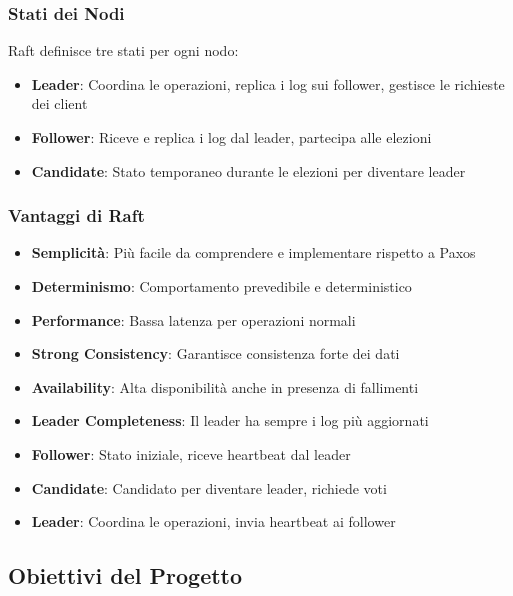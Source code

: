 \documentclass[12pt,a4paper]{article}
\begin{document}
\subsubsection{Stati dei Nodi}

Raft definisce tre stati per ogni nodo:
\begin{itemize}
\item \textbf{Leader}: Coordina le operazioni, replica i log sui follower, gestisce le richieste dei client
\item \textbf{Follower}: Riceve e replica i log dal leader, partecipa alle elezioni
\item \textbf{Candidate}: Stato temporaneo durante le elezioni per diventare leader
\end{itemize}

\subsubsection{Vantaggi di Raft}

\begin{itemize}
\item \textbf{Semplicità}: Più facile da comprendere e implementare rispetto a Paxos
\item \textbf{Determinismo}: Comportamento prevedibile e deterministico
\item \textbf{Performance}: Bassa latenza per operazioni normali
\item \textbf{Strong Consistency}: Garantisce consistenza forte dei dati
\item \textbf{Availability}: Alta disponibilità anche in presenza di fallimenti
\item \textbf{Leader Completeness}: Il leader ha sempre i log più aggiornati
\end{itemize}

\begin{itemize}
\item \textbf{Follower}: Stato iniziale, riceve heartbeat dal leader
\item \textbf{Candidate}: Candidato per diventare leader, richiede voti
\item \textbf{Leader}: Coordina le operazioni, invia heartbeat ai follower
\end{itemize}

\subsection{Obiettivi del Progetto}
\end{document}
